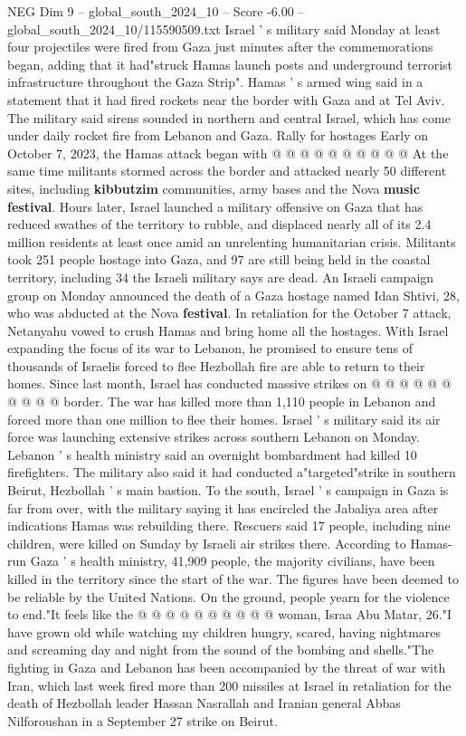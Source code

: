 \begin{textsample}{NEG Dim 9 – global\_south\_2024\_10 – Score -6.00 – global\_south\_2024\_10/115590509.txt}
Israel ' s military said Monday at least four projectiles were fired from Gaza just minutes after the commemorations began, adding that it had"struck Hamas launch posts and underground terrorist infrastructure throughout the Gaza Strip".
Hamas ' s armed wing said in a statement that it had fired rockets near the border with Gaza and at Tel Aviv.
The military said sirens sounded in northern and central Israel, which has come under daily rocket fire from Lebanon and Gaza.
Rally for hostages Early on October 7, 2023, the Hamas attack began with @ @ @ @ @ @ @ @ @ @ At the same time militants stormed across the border and attacked nearly 50 different sites, including \textbf{kibbutzim} communities, army bases and the Nova \textbf{music} \textbf{festival}.
Hours later, Israel launched a military offensive on Gaza that has reduced swathes of the territory to rubble, and displaced nearly all of its 2.4 million residents at least once amid an unrelenting humanitarian crisis.
Militants took 251 people hostage into Gaza, and 97 are still being held in the coastal territory, including 34 the Israeli military says are dead.
An Israeli campaign group on Monday announced the death of a Gaza hostage named Idan Shtivi, 28, who was abducted at the Nova \textbf{festival}.
In retaliation for the October 7 attack, Netanyahu vowed to crush Hamas and bring home all the hostages.
With Israel expanding the focus of its war to Lebanon, he promised to ensure tens of thousands of Israelis forced to flee Hezbollah fire are able to return to their homes.
Since last month, Israel has conducted massive strikes on @ @ @ @ @ @ @ @ @ @ border.
The war has killed more than 1,110 people in Lebanon and forced more than one million to flee their homes.
Israel ' s military said its air force was launching extensive strikes across southern Lebanon on Monday.
Lebanon ' s health ministry said an overnight bombardment had killed 10 firefighters.
The military also said it had conducted a"targeted"strike in southern Beirut, Hezbollah ' s main bastion.
To the south, Israel ' s campaign in Gaza is far from over, with the military saying it has encircled the Jabaliya area after indications Hamas was rebuilding there.
Rescuers said 17 people, including nine children, were killed on Sunday by Israeli air strikes there.
According to Hamas-run Gaza ' s health ministry, 41,909 people, the majority civilians, have been killed in the territory since the start of the war.
The figures have been deemed to be reliable by the United Nations.
On the ground, people yearn for the violence to end."It feels like the @ @ @ @ @ @ @ @ @ @ woman, Israa Abu Matar, 26."I have grown old while watching my children hungry, scared, having nightmares and screaming day and night from the sound of the bombing and shells."The fighting in Gaza and Lebanon has been accompanied by the threat of war with Iran, which last week fired more than 200 missiles at Israel in retaliation for the death of Hezbollah leader Hassan Nasrallah and Iranian general Abbas Nilforoushan in a September 27 strike on Beirut.

\end{textsample}
